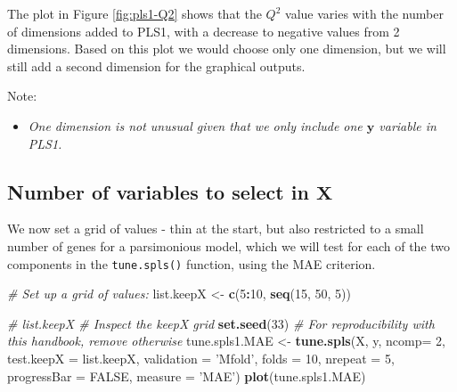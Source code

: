 \documentclass[]{book}
\newenvironment{Shaded}{\begin{snugshade}}{\end{snugshade}}
\newcommand{\CommentTok}[1]{\textcolor[rgb]{0.56,0.35,0.01}{\textit{#1}}}
\newcommand{\DataTypeTok}[1]{\textcolor[rgb]{0.13,0.29,0.53}{#1}}
\newcommand{\DecValTok}[1]{\textcolor[rgb]{0.00,0.00,0.81}{#1}}
\newcommand{\KeywordTok}[1]{\textcolor[rgb]{0.13,0.29,0.53}{\textbf{#1}}}
\newcommand{\NormalTok}[1]{#1}
\newcommand{\OperatorTok}[1]{\textcolor[rgb]{0.81,0.36,0.00}{\textbf{#1}}}
\newcommand{\OtherTok}[1]{\textcolor[rgb]{0.56,0.35,0.01}{#1}}
\newcommand{\StringTok}[1]{\textcolor[rgb]{0.31,0.60,0.02}{#1}}
\providecommand{\tightlist}{%
  \setlength{\itemsep}{0pt}\setlength{\parskip}{0pt}}
\begin{document}
The plot in Figure \ref{fig:pls1-Q2} shows that the \(Q^2\) value varies with the number of dimensions added to PLS1, with a decrease to negative values from 2 dimensions. Based on this plot we would choose only one dimension, but we will still add a second dimension for the graphical outputs.

Note:

\begin{itemize}
\tightlist
\item
  \emph{One dimension is not unusual given that we only include one \(\boldsymbol y\) variable in PLS1.}
\end{itemize}

\hypertarget{number-of-variables-to-select-in-boldsymbol-x}{%
\subsection{\texorpdfstring{Number of variables to select in \(\boldsymbol X\)}{Number of variables to select in \textbackslash{}boldsymbol X}}\label{number-of-variables-to-select-in-boldsymbol-x}}

We now set a grid of values - thin at the start, but also restricted to a small number of genes for a parsimonious model, which we will test for each of the two components in the \texttt{tune.spls()} function, using the MAE criterion.

\begin{Shaded}
\begin{Highlighting}[]
\CommentTok{# Set up a grid of values: }
\NormalTok{list.keepX <-}\StringTok{ }\KeywordTok{c}\NormalTok{(}\DecValTok{5}\OperatorTok{:}\DecValTok{10}\NormalTok{, }\KeywordTok{seq}\NormalTok{(}\DecValTok{15}\NormalTok{, }\DecValTok{50}\NormalTok{, }\DecValTok{5}\NormalTok{))     }

\CommentTok{# list.keepX  # Inspect the keepX grid}
\KeywordTok{set.seed}\NormalTok{(}\DecValTok{33}\NormalTok{)  }\CommentTok{# For reproducibility with this handbook, remove otherwise}
\NormalTok{tune.spls1.MAE <-}\StringTok{ }\KeywordTok{tune.spls}\NormalTok{(X, y, }\DataTypeTok{ncomp=} \DecValTok{2}\NormalTok{, }
                            \DataTypeTok{test.keepX =}\NormalTok{ list.keepX, }
                            \DataTypeTok{validation =} \StringTok{'Mfold'}\NormalTok{, }
                            \DataTypeTok{folds =} \DecValTok{10}\NormalTok{,}
                            \DataTypeTok{nrepeat =} \DecValTok{5}\NormalTok{, }
                            \DataTypeTok{progressBar =} \OtherTok{FALSE}\NormalTok{, }
                            \DataTypeTok{measure =} \StringTok{'MAE'}\NormalTok{)}
\KeywordTok{plot}\NormalTok{(tune.spls1.MAE)}
\end{Highlighting}
\end{Shaded}
\end{document}
